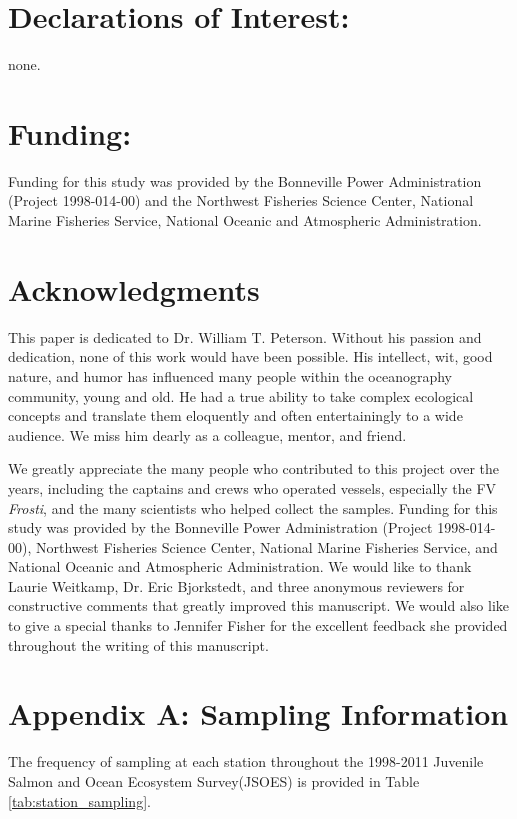 \documentclass[preprint, authoryear, 12pt]{elsarticle}
\begin{document}
\section{Declarations of Interest:}
none.

\section{Funding:}
Funding for this study was provided by the Bonneville Power Administration (Project 1998-014-00) and the Northwest Fisheries Science Center, National Marine Fisheries Service, National Oceanic and Atmospheric Administration.

\section{Acknowledgments}
This paper is dedicated to Dr. William T. Peterson. Without his passion and dedication, none of this work would have been possible. His intellect, wit, good nature, and humor has influenced many people within the oceanography community, young and old. He had a true ability to take complex ecological concepts and translate them eloquently and often entertainingly to a wide audience. We miss him dearly as a colleague, mentor, and friend.

We greatly appreciate the many people who contributed to this project over the years,
including the captains and crews who operated vessels, especially the FV \textit{Frosti}, and the many scientists who helped collect the samples. Funding for this study was provided by the Bonneville Power Administration (Project 1998-014-00), Northwest Fisheries Science Center, National Marine Fisheries Service, and National Oceanic and Atmospheric Administration. We would like to thank Laurie Weitkamp, Dr. Eric Bjorkstedt, and three anonymous reviewers for constructive comments that greatly improved this manuscript.  We would also like to give a special thanks to Jennifer Fisher for the excellent feedback she provided throughout the writing of this manuscript.

\clearpage
\section*{Appendix A: Sampling Information}
\setcounter{table}{0}
\renewcommand{\thetable}{A.\arabic{table}}

The frequency of sampling at each station throughout the 1998-2011 Juvenile Salmon and Ocean Ecosystem Survey(JSOES) is provided in Table \ref{tab:station_sampling}.
\end{document}
